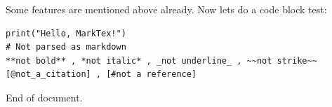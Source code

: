 \documentclass{article}
\begin{document}
Some features are mentioned above already. Now lets do a code block test:

\begin{verbatim}
print("Hello, MarkTex!")
# Not parsed as markdown
**not bold** , *not italic* , _not underline_ , ~~not strike~~
[@not_a_citation] , [#not a reference]

\end{verbatim}

End of document.





\end{document}
